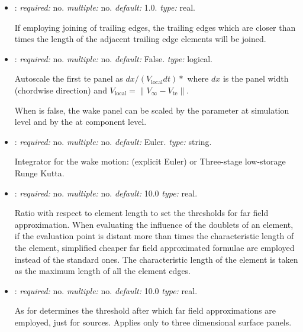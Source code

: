 \begin{itemize}
Employ trailing edge joining for close trailing edges.

\item {}: \textit{required:} no. \textit{multiple:} no. 
\textit{default:} 1.0. \textit{type:} real.

If employing joining of trailing edges, the trailing edges which are closer than 
 times the length of the adjacent trailing edge elements 
will be joined. 

\item {}: \textit{required:} no. \textit{multiple:} no. 
\textit{default:} False. \textit{type:} logical. 

Autoscale the first te panel as $dx/(V_\mathrm{local}dt)*$ 
where $dx$ is the panel width (chordwise direction) and 
$V_\mathrm{local} = \|V_\infty-V_\mathrm{te}\|$. 

When is false, the wake panel can be scaled by the  
parameter at simulation level and by the  at component level.

\item {}: \textit{required: } no. \textit{multiple:} no. 
\textit{default:} Euler. \textit{type:} string. 

Integrator for the wake motion:  (explicit Euler) or 
Three-stage low-storage Runge Kutta.  

\item {}: \textit{required:} no. \textit{multiple:} no. 
\textit{default:} 10.0 \textit{type:} real.

Ratio with respect to element length to set the thresholds for far field approximation. 
When evaluating the influence of the doublets of an element, 
if the evaluation point is distant more than  
times the characteristic length of the element, simplified cheaper far field 
approximated formulae are employed instead of the standard ones. 
The characteristic length of the element is taken as the maximum 
length of all the element edges.

\item {}: \textit{required:} no. 
\textit{multiple:} no. \textit{default:} 10.0 \textit{type:} real.

As for  determines the threshold 
after which far field approximations are employed, just for sources. 
Applies only to three dimensional surface panels. 


\end{itemize}
